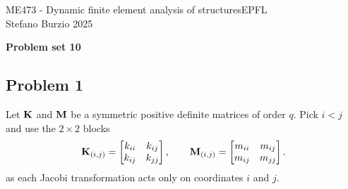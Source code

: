 \documentclass[12pt]{article}
\begin{document}
\noindent ME473 - Dynamic finite element analysis of structures\hfill EPFL\\
Stefano Burzio \hfill 2025\\
\vspace{0.3cm}

\hspace*{\fill}\textbf{\Large Problem set 10}\hspace*{\fill}

\hrulefill

\subsection*{Problem 1}

Let $\mathbf{K}$ and $\mathbf{M}$ be a symmetric positive definite matrices of order $q$. Pick $i<j$ and use the $2\times 2$ blocks
\[
  \mathbf{K}_{(i,j)}=\begin{bmatrix}k_{ii}&k_{ij}\\k_{ij}&k_{jj}\end{bmatrix},\qquad
  \mathbf{M}_{(i,j)}=\begin{bmatrix}m_{ii}&m_{ij}\\m_{ij}&m_{jj}\end{bmatrix} .
\]
as each Jacobi transformation acts only on coordinates $i$ and $j$.
\end{document}

